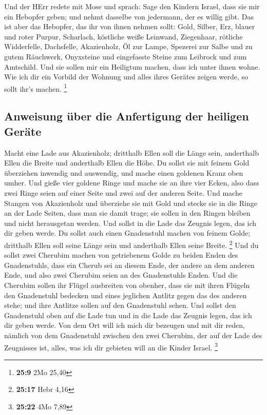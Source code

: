  Und der HErr redete mit Mose und sprach: 
Sage den Kindern Israel, dass sie mir ein Hebopfer geben; und nehmt
dasselbe von jedermann, der es willig gibt.  Das ist aber
das Hebopfer, das ihr von ihnen nehmen sollt: Gold, Silber, Erz,
 blauer und roter Purpur, Scharlach, köstliche weiße
Leinwand, Ziegenhaar,  rötliche Widderfelle, Dachsfelle,
Akazienholz,  Öl zur Lampe, Spezerei zur Salbe und zu
gutem Räuchwerk,  Onyxsteine und eingefasste Steine zum
Leibrock und zum Amtschild.  Und sie sollen mir ein
Heiligtum machen, dass ich unter ihnen wohne.  Wie ich dir
ein Vorbild der Wohnung und alles ihres Gerätes zeigen werde, so sollt
ihr's machen. \footnote{\textbf{25:9} 2Mo 25,40}

\hypertarget{anweisung-uxfcber-die-anfertigung-der-heiligen-geruxe4te}{%
\subsection{Anweisung über die Anfertigung der heiligen
Geräte}\label{anweisung-uxfcber-die-anfertigung-der-heiligen-geruxe4te}}

 Macht eine Lade aus Akazienholz; dritthalb Ellen soll
die Länge sein, anderthalb Ellen die Breite und anderthalb Ellen die
Höhe.  Du sollst sie mit feinem Gold überziehen inwendig
und auswendig, und mache einen goldenen Kranz oben umher.
 Und gieße vier goldene Ringe und mache sie an ihre vier
Ecken, also dass zwei Ringe seien auf einer Seite und zwei auf der
anderen Seite.  Und mache Stangen von Akazienholz und
überziehe sie mit Gold  und stecke sie in die Ringe an
der Lade Seiten, dass man sie damit trage;  sie sollen in
den Ringen bleiben und nicht herausgetan werden.  Und
sollst in die Lade das Zeugnis legen, das ich dir geben werde.
 Du sollst auch einen Gnadenstuhl machen von feinem
Golde; dritthalb Ellen soll seine Länge sein und anderthalb Ellen seine
Breite. \footnote{\textbf{25:17} Hebr 4,16}  Und du
sollst zwei Cherubim machen von getriebenem Golde zu beiden Enden des
Gnadenstuhls,  dass ein Cherub sei an diesem Ende, der
andere an dem anderen Ende, und also zwei Cherubim seien an des
Gnadenstuhls Enden.  Und die Cherubim sollen ihr Flügel
ausbreiten von obenher, dass sie mit ihren Flügeln den Gnadenstuhl
bedecken und eines jeglichen Antlitz gegen das des anderen stehe; und
ihre Antlitze sollen auf den Gnadenstuhl sehen.  Und
sollst den Gnadenstuhl oben auf die Lade tun und in die Lade das Zeugnis
legen, das ich dir geben werde.  Von dem Ort will ich
mich dir bezeugen und mit dir reden, nämlich von dem Gnadenstuhl
zwischen den zwei Cherubim, der auf der Lade des Zeugnisses ist, alles,
was ich dir gebieten will an die Kinder Israel. \footnote{\textbf{25:22}
  4Mo 7,89}

